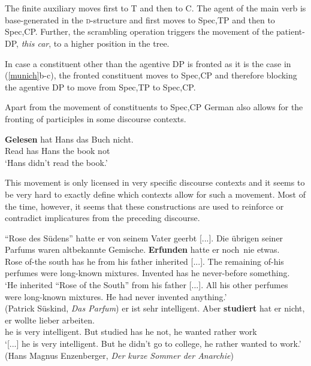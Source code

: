 \documentclass[letterpaper,parskip=half]{scrartcl}
\begin{document}
\normalsize

\ \\
\ \\

The finite auxiliary moves first to T and then to C. The agent of the main verb is base-generated in the \textsc{d}-structure and first moves to Spec,TP and then to Spec,CP. Further, the scrambling operation triggers the movement of the patient-DP, \textit{this car}, to a higher position in the tree. 

In case a constituent other than the agentive DP is fronted as it is the case in (\ref{munich}b-c), the fronted constituent moves to Spec,CP and therefore blocking the agentive DP to move from Spec,TP to Spec,CP.

Apart from the movement of constituents to Spec,CP German also allows for the fronting of participles in some  discourse contexts.

\begin{exe}
\ex \label{gelesen} \gll  \textbf{Gelesen} hat Hans das Buch nicht. \\
Read has Hans the book not\\
`Hans didn't read the book.'\\
\citep{denbesten1990stranding}

\end{exe}

This movement is only licensed in very specific discourse contexts and it seems to be very hard to exactly define 
which contexts allow for such a movement. Most of the time, however, it seems that these constructions are used to reinforce or contradict implicatures from the preceding discourse.

\begin{exe}
\ex \label{parfum1} \gll ``Rose des Südens'' hatte er von seinem Vater geerbt [...]. Die übrigen seiner Parfums waren altbekannte Gemische.  \textbf{Erfunden} hatte er noch~nie etwas. \\
Rose of-the south has he from his father inherited [...]. The remaining of-his perfumes were long-known mixtures. Invented has he never-before something.  \\
`He inherited ``Rose of the South'' from his father [...]. All his other perfumes were long-known mixtures. He had never invented anything.' \\
(Patrick Süskind, \textit{Das Parfum})
\ex \label{sommer1} \gll {[...]} er ist sehr intelligent. Aber \textbf{studiert} hat er nicht, er wollte lieber arbeiten. \\
 {} he is very intelligent. But studied has he not, he wanted rather work \\
`[...] he is very intelligent. But he didn't go to college, he rather wanted to work.'\\
(Hans Magnus Enzenberger, \textit{Der kurze Sommer der Anarchie})
\end{exe}
\end{document}
